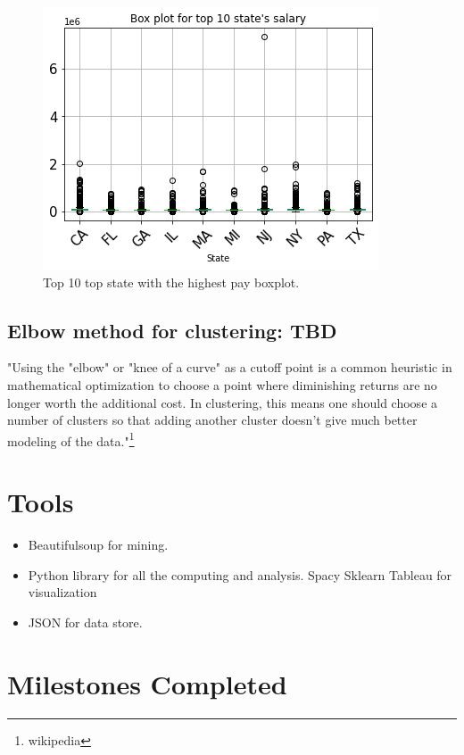 \begin{figure}[h!]
	\begin{center}
		\includegraphics[width=\linewidth]{./photos/top10state.png}
	\end{center}
	\caption{Top 10 top state with the highest pay boxplot.}
\end{figure}
\subsection{Elbow method for clustering: TBD}
"Using the "elbow" or "knee of a curve" as a cutoff point is a common heuristic in mathematical optimization to choose a point where diminishing returns are no longer worth the additional cost. In clustering, this means one should choose a number of clusters so that adding another cluster doesn't give much better modeling of the data."\footnote{wikipedia}
\section{Tools}
\begin{itemize}
	\item Beautifulsoup for mining.
	\item Python library for all the computing and analysis.
	\subitem Spacy
	\subitem Sklearn 
	\subitem Tableau for visualization
	\item JSON for data store.
\end{itemize}
\section{Milestones Completed}

